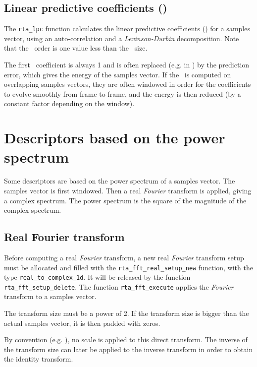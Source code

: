 \documentclass[a4paper, twoside]{article}
\begin{document}
\subsection{Linear predictive coefficients (\lpc)}
\label{sec:lpc}

The \texttt{rta\_lpc} function calculates the linear predictive
coefficients (\lpc) for a samples vector, using an auto-correlation
and a \textit{Levinson-Durbin} decomposition. Note that the \lpc\
order is one value less than the \lpc\ size.

The first \lpc\ coefficient is always 1 and is often replaced (e.g. in
\htk) by the prediction error, which gives the energy of the samples
vector. If the \lpc\ is computed on overlapping samples vectors, they
are often windowed in order for the coefficients to evolve smoothly
from frame to frame, and the energy is then reduced (by a constant
factor depending on the window).

\section{Descriptors based on the power spectrum}
\label{sec:power_spectrum_descriptors}

Some descriptors are based on the power spectrum of a samples
vector. The samples vector is first windowed. Then a real
\textit{Fourier} transform is applied, giving a complex spectrum. The
power spectrum is the square of the magnitude of the complex spectrum.

\subsection{Real Fourier transform}
\label{sec:fft}

Before computing a real \textit{Fourier} transform, a new real
\textit{Fourier} transform setup must be allocated and filled with the
\texttt{rta\_fft\_real\_setup\_new} function, with the type
\texttt{real\_to\_complex\_1d}. It will be released by the
function \texttt{rta\_fft\_setup\_delete}. The function
\texttt{rta\_fft\_execute} applies the \textit{Fourier} transform
to a samples vector.

The transform size must be a power of 2. If the transform size is
bigger than the actual samples vector, it is then padded with zeros.

By convention (e.g. \htk), no scale is applied to this direct
transform. The inverse of the transform size can later be applied to
the inverse transform in order to obtain the identity transform.
\end{document}
